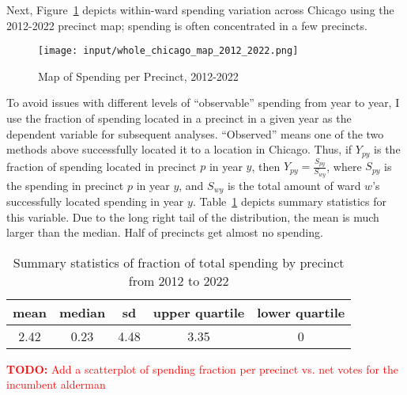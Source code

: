 Next, Figure~\ref{fig:spending_map} depicts within-ward spending variation across Chicago using the 2012-2022 precinct map; spending is often concentrated in a few precincts.

\begin{figure}[H]
    \centering
    \texttt{[image: input/whole\_chicago\_map\_2012\_2022.png]}
    \caption{Map of Spending per Precinct, 2012-2022}
    \label{fig:spending_map}
\end{figure}

To avoid issues with different levels of ``observable'' spending from year to year, I use the fraction of spending located in a precinct in a given year as the dependent variable for subsequent analyses.
``Observed'' means one of the two methods above successfully located it to a location in Chicago.
Thus, if $Y_{py}$ is the fraction of spending located in precinct $p$ in year $y$, then $Y_{py} = \frac{S_{py}}{S_{wy}}$, where $S_{py}$ is the spending in precinct $p$ in year $y$, and $S_{wy}$ is the total amount of ward $w$'s successfully located spending in year $y$.
Table~\ref{summary_stats} depicts summary statistics for this variable.
Due to the long right tail of the distribution, the mean is much larger than the median.
Half of precincts get almost no spending.

\begin{table}[H]
\caption{Summary statistics of fraction of total spending by precinct from 2012 to 2022}\label{summary_stats}
\centering
\begin{tabular}[t]{ccccc}
\toprule
mean & median & sd & upper quartile & lower quartile\\
\midrule
2.42 & 0.23 & 4.48 & 3.35 & 0\\
\bottomrule
\end{tabular}
\end{table}

\textcolor{red}{\textbf{TODO:} Add a scatterplot of spending fraction per precinct vs. net votes for the incumbent alderman}